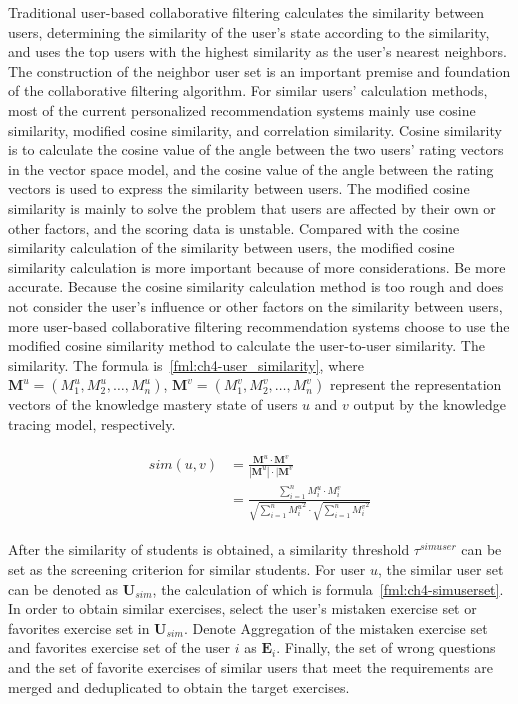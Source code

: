 Traditional user-based collaborative filtering calculates the similarity between users, determining the similarity of the user's state according to the similarity, and uses the top users with the highest similarity as the user's nearest neighbors. The construction of the neighbor user set is an important premise and foundation of the collaborative filtering algorithm. For similar users' calculation methods, most of the current personalized recommendation systems mainly use cosine similarity, modified cosine similarity, and correlation similarity. Cosine similarity is to calculate the cosine value of the angle between the two users' rating vectors in the vector space model, and the cosine value of the angle between the rating vectors is used to express the similarity between users. The modified cosine similarity is mainly to solve the problem that users are affected by their own or other factors, and the scoring data is unstable. Compared with the cosine similarity calculation of the similarity between users, the modified cosine similarity calculation is more important because of more considerations. Be more accurate. Because the cosine similarity calculation method is too rough and does not consider the user's influence or other factors on the similarity between users, more user-based collaborative filtering recommendation systems choose to use the modified cosine similarity method to calculate the user-to-user similarity. The similarity. The formula is~\ref{fml:ch4-user_similarity}, where \(\mathbf{M}^u=(M^u_1,M^u_2,\ldots,M^u_n)\), \(\mathbf{M}^v=(M^v_1,M^v_2,\ldots, M^v_n)\) represent the representation vectors of the knowledge mastery state of users \(u\) and \(v\) output by the knowledge tracing model, respectively.

\begin{align}\label{fml:ch4-user_similarity}
    \begin{split}
        sim(u, v) & =\frac{\mathbf{M}^u \cdot \mathbf{M}^v}{|\mathbf{M}^u|\cdot |\mathbf{M}^v}                                                                 \\
        & =\frac{\sum\limits_{i = 1}^{n}{M^u_i\cdot M^v_i}}{\sqrt{\sum\limits_{i = 1}^{n}{{M^u_i}^2}}\cdot\sqrt{\sum\limits_{i = 1}^{n}{{M^v_i}^2}}}
    \end{split}
\end{align}

After the similarity of students is obtained, a similarity threshold \(\tau^{simuser}\) can be set as the screening criterion for similar students. For user \(u\), the similar user set can be denoted as \(\mathbf{U}_{sim}\), the calculation of which is formula~\ref{fml:ch4-simuserset}. In order to obtain similar exercises, select the user's mistaken exercise set or favorites exercise set in \(\mathbf{U}_{sim}\). Denote Aggregation of the mistaken exercise set and favorites exercise set of the user \(i\) as \(\mathbf{E}_{i}\). Finally, the set of wrong questions and the set of favorite exercises of similar users that meet the requirements are merged and deduplicated to obtain the target exercises.

